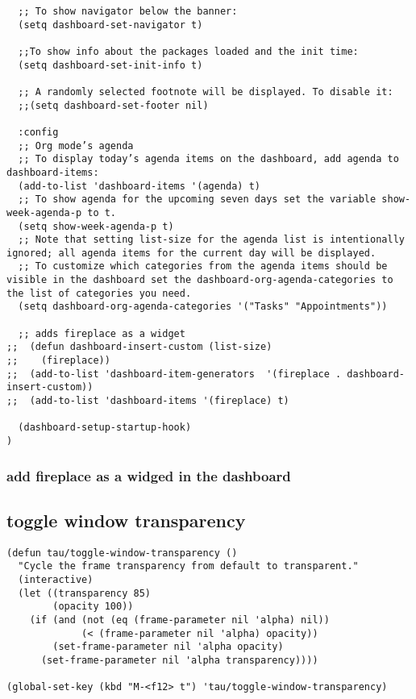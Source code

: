\documentclass[11pt]{article}
\begin{document}
\begin{verbatim}
  ;; To show navigator below the banner:
  (setq dashboard-set-navigator t)

  ;;To show info about the packages loaded and the init time:
  (setq dashboard-set-init-info t)

  ;; A randomly selected footnote will be displayed. To disable it:
  ;;(setq dashboard-set-footer nil)

  :config
  ;; Org mode’s agenda
  ;; To display today’s agenda items on the dashboard, add agenda to dashboard-items:
  (add-to-list 'dashboard-items '(agenda) t)
  ;; To show agenda for the upcoming seven days set the variable show-week-agenda-p to t.
  (setq show-week-agenda-p t)
  ;; Note that setting list-size for the agenda list is intentionally ignored; all agenda items for the current day will be displayed.
  ;; To customize which categories from the agenda items should be visible in the dashboard set the dashboard-org-agenda-categories to the list of categories you need.
  (setq dashboard-org-agenda-categories '("Tasks" "Appointments"))

  ;; adds fireplace as a widget
;;  (defun dashboard-insert-custom (list-size)
;;    (fireplace))
;;  (add-to-list 'dashboard-item-generators  '(fireplace . dashboard-insert-custom))
;;  (add-to-list 'dashboard-items '(fireplace) t)

  (dashboard-setup-startup-hook)
)
\end{verbatim}

\subsubsection*{add fireplace as a widged in the dashboard}
\label{sec:org528a152}
\subsection*{toggle window transparency}
\label{sec:org0e7d506}

\begin{verbatim}
(defun tau/toggle-window-transparency ()
  "Cycle the frame transparency from default to transparent."
  (interactive)
  (let ((transparency 85)
        (opacity 100))
    (if (and (not (eq (frame-parameter nil 'alpha) nil))
             (< (frame-parameter nil 'alpha) opacity))
        (set-frame-parameter nil 'alpha opacity)
      (set-frame-parameter nil 'alpha transparency))))

(global-set-key (kbd "M-<f12> t") 'tau/toggle-window-transparency)
\end{verbatim}
\end{document}
